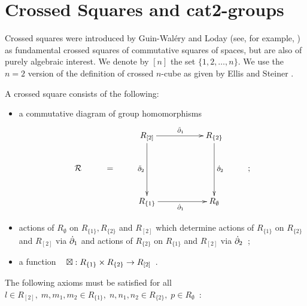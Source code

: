 
\section{Crossed Squares and cat2-groups} \label{sect:xsq-cat2}

Crossed squares were introduced by Guin-Wal\'ery and Loday 
(see, for example, \cite{walery:loday,loday1,brow:lod})
as fundamental crossed squares of commutative squares of spaces,
but are also of purely algebraic interest.
We denote by $[n]$ the set $\{1,2,\ldots,n\}$.
We use the $n=2$ version of the definition of crossed $n$-cube
as given by Ellis and Steiner \cite{ell:st}.

\begin{defn} \label{def:xsq}  
A crossed square consists of the following:
\begin{itemize}
\item
a commutative diagram of group homomorphisms
\begin{equation} \label{eq:Rsquare}
\vcenter{\xymatrix{
       &   &  R_{[2]} \ar[rr]^{\ddbdyo} \ar[dd]_{\ddbdyt} 
              && R_{\{2\}} \ar[dd]^{\dbdyt} &   \\
\calR  & = &  &&                 & ; \\
       &   &  R_{\{1\}} \ar[rr]_{\dbdyo}  
              && R_{\emptyset} 
}} 
\end{equation}
\item
actions of $R_{\emptyset}$ on $R_{\{1\}}, R_{\{2\}}$ and $R_{[2]}$ 
which determine actions of 
$R_{\{1\}}$ on $R_{\{2\}}$ and $R_{[2]}$ via $\dot{\partial}_1$ 
and actions of 
$R_{\{2\}}$ on $R_{\{1\}}$ and $R_{[2]}$ via $\dot{\partial}_2$~;
\item
a function ~ $\boxtimes : R_{\{1\}} \times R_{\{2\}} \to R_{[2]}$~.
\end{itemize}
The following axioms must be satisfied for all 
$l \in R_{[2]},\; m,m_1,m_2 \in R_{\{1\}},\; 
n,n_1,n_2 \in R_{\{2\}},\; p \in R_{\emptyset}$~:
\end{defn}
